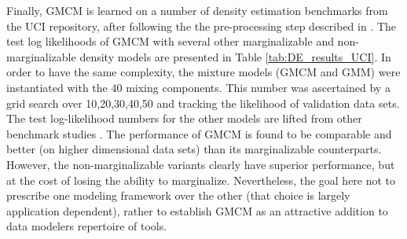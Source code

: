 \documentclass{article}
\theoremstyle{plain}
\theoremstyle{definition}
\theoremstyle{remark}
\begin{document}
Finally, GMCM is learned on a number of density estimation benchmarks from the UCI repository, after following the the pre-processing step described in \citep{Papamakarios2017}. The test log likelihoods of GMCM with several other marginalizable and non-marginalizable density models are presented in Table \ref{tab:DE_results_UCI}. In order to have the same complexity, the mixture models (GMCM and GMM) were instantiated with the 40 mixing components. This number was ascertained by a grid search over {10,20,30,40,50} and tracking the likelihood of validation data sets. The test log-likelihood numbers for the other models are lifted from other benchmark studies \citep{Papamakarios2017, Gilboa2021}. The performance of GMCM is found to be comparable and better (on higher dimensional data sets) than its marginalizable counterparts. However, the non-marginalizable variants clearly have superior performance, but at the cost of losing the ability to marginalize. Nevertheless, the goal here not to prescribe one modeling framework over the other (that choice is largely application dependent), rather to establish GMCM as an attractive addition to data modelers repertoire of tools.
\end{document}
